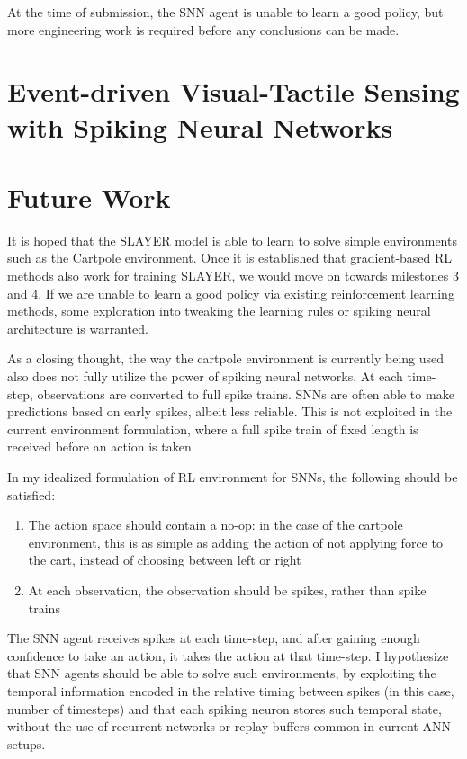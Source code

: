 \documentclass[fyp]{socreport}
\begin{document}
At the time of submission, the SNN agent is unable to learn a good policy, but
more engineering work is required before any conclusions can be made.

\chapter{Event-driven Visual-Tactile Sensing with Spiking Neural Networks\label{cha:vtsnn}}
\chapter{Future Work}

It is hoped that the SLAYER model is able to learn to solve simple environments
such as the Cartpole environment. Once it is established that gradient-based RL
methods also work for training SLAYER, we would move on towards milestones 3 and
4. If we are unable to learn a good policy via existing reinforcement learning
methods, some exploration into tweaking the learning rules or spiking neural
architecture is warranted.

As a closing thought, the way the cartpole environment is currently being used
also does not fully utilize the power of spiking neural networks. At each
time-step, observations are converted to full spike trains. SNNs are often able
to make predictions based on early spikes, albeit less reliable. This is not
exploited in the current environment formulation, where a full spike train of
fixed length is received before an action is taken.

In my idealized formulation of RL environment for SNNs, the following should be
satisfied:

\begin{enumerate}
  \item The action space should contain a no-op: in the case of the cartpole
  environment, this is as simple as adding the action of not applying force to
  the cart, instead of choosing between left or right
\item At each observation, the observation should be spikes, rather than spike
trains
\end{enumerate}

The SNN agent receives spikes at each time-step, and after gaining enough
confidence to take an action, it takes the action at that time-step. I
hypothesize that SNN agents should be able to solve such environments, by
exploiting the temporal information encoded in the relative timing between
spikes (in this case, number of timesteps) and that each spiking neuron stores
such temporal state, without the use of recurrent networks or replay buffers
common in current ANN setups.



\appendix
\end{document}
